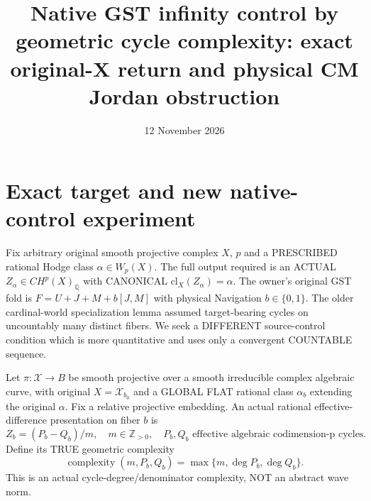 \documentclass{article}
\title{Native GST infinity control by geometric cycle complexity: exact original-X return and physical CM Jordan obstruction}
\date{12 November 2026}
\begin{document}
\maketitle

\section{Exact target and new native-control experiment}
Fix arbitrary original smooth projective complex $X$, $p$ and a PRESCRIBED rational Hodge class $\alpha\in W_p(X)$.
The full output required is an ACTUAL $Z_\alpha\in CH^p(X)_{\mathbb Q}$ with CANONICAL $\mathrm{cl}_X(Z_\alpha)=\alpha$.
The owner's original GST fold is $F=U+J+M+b[J,M]$ with physical Navigation $b\in\{0,1\}$.
The older cardinal-world specialization lemma assumed target-bearing cycles on uncountably many distinct fibers.
We seek a DIFFERENT source-control condition which is more quantitative and uses only a convergent COUNTABLE sequence.

Let $\pi:\mathcal X\to B$ be smooth projective over a smooth irreducible complex algebraic curve, with original $X=\mathcal X_{b_0}$ and a GLOBAL FLAT rational class $\alpha_b$ extending the original $\alpha$.
Fix a relative projective embedding. An actual rational effective-difference presentation on fiber $b$ is
\[
Z_b=(P_b-Q_b)/m,\quad m\in\mathbb Z_{>0},\quad
P_b,Q_b\text{ effective algebraic codimension-p cycles}.
\]
Define its TRUE geometric complexity
\[
\operatorname{complexity}(m,P_b,Q_b)=\max\{m,\deg P_b,\deg Q_b\}.
\]
This is an actual cycle-degree/denominator complexity, NOT an abstract wave norm.
\end{document}
